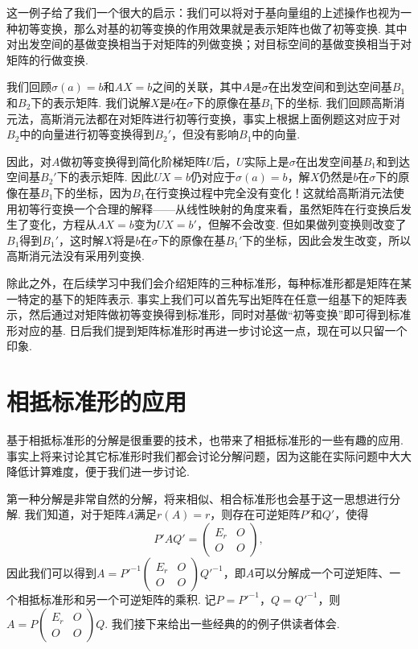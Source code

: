 这一例子给了我们一个很大的启示：我们可以将对于基向量组的上述操作也视为一种初等变换，那么对基的初等变换的作用效果就是表示矩阵也做了初等变换. 其中对出发空间的基做变换相当于对矩阵的列做变换；对目标空间的基做变换相当于对矩阵的行做变换.

我们回顾$\sigma(a)=b$和$AX=b$之间的关联，其中$A$是$\sigma$在出发空间和到达空间基$B_1$和$B_2$下的表示矩阵. 我们说解$X$是$b$在$\sigma$下的原像在基$B_1$下的坐标. 我们回顾高斯消元法，高斯消元法都在对矩阵进行初等行变换，事实上根据上面例题这对应于对$B_2$中的向量进行初等变换得到$B_2'$，但没有影响$B_1$中的向量.

因此，对$A$做初等变换得到简化阶梯矩阵$U$后，$U$实际上是$\sigma$在出发空间基$B_1$和到达空间基$B_2'$下的表示矩阵. 因此$UX=b$仍对应于$\sigma(a)=b$，解$X$仍然是$b$在$\sigma$下的原像在基$B_1$下的坐标，因为$B_1$在行变换过程中完全没有变化！这就给高斯消元法使用初等行变换一个合理的解释——从线性映射的角度来看，虽然矩阵在行变换后发生了变化，方程从$AX=b$变为$UX=b'$，但解不会改变. 但如果做列变换则改变了$B_1$得到$B_1'$，这时解$X$将是$b$在$\sigma$下的原像在基$B_1'$下的坐标，因此会发生改变，所以高斯消元法没有采用列变换.

除此之外，在后续学习中我们会介绍矩阵的三种标准形，每种标准形都是矩阵在某一特定的基下的矩阵表示. 事实上我们可以首先写出矩阵在任意一组基下的矩阵表示，然后通过对矩阵做初等变换得到标准形，同时对基做``初等变换''即可得到标准形对应的基. 日后我们提到矩阵标准形时再进一步讨论这一点，现在可以只留一个印象.

\section{相抵标准形的应用}

基于相抵标准形的分解是很重要的技术，也带来了相抵标准形的一些有趣的应用. 事实上将来讨论其它标准形时我们都会讨论分解问题，因为这能在实际问题中大大降低计算难度，便于我们进一步讨论.

第一种分解是非常自然的分解，将来相似、相合标准形也会基于这一思想进行分解. 我们知道，对于矩阵$A$满足$r(A)=r$，则存在可逆矩阵$P'$和$Q'$，使得
\[P'AQ'=\begin{pmatrix}
        E_r & O \\ O & O
    \end{pmatrix},\]
因此我们可以得到$A=P'^{-1}\begin{pmatrix}
        E_r & O \\ O & O
    \end{pmatrix}Q'^{-1}$，即$A$可以分解成一个可逆矩阵、一个相抵标准形和另一个可逆矩阵的乘积. 记$P=P'^{-1}$，$Q=Q'^{-1}$，则$A=P\begin{pmatrix}
        E_r & O \\ O & O
    \end{pmatrix}Q$. 我们接下来给出一些经典的的例子供读者体会.

